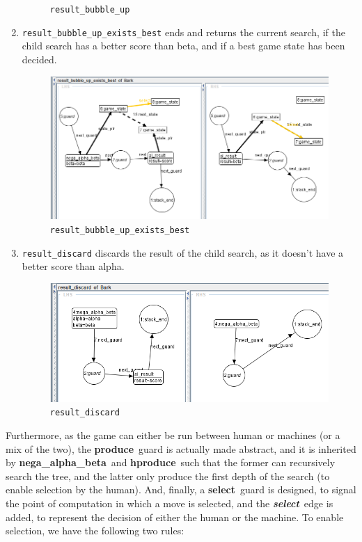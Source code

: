 \documentclass[a4paper, 10pt]{scrartcl}
\newcommand{\noderepr}[1]{\textsf{\textbf{#1}}}
\newcommand{\edgerepr}[1]{\textit{\textbf{#1}}}
\newcommand{\produce}{\noderepr{produce}}
\newcommand{\hproduce}{\noderepr{hproduce}}
\newcommand{\ai}{\noderepr{nega\_alpha\_beta}}
\newcommand{\select}{\noderepr{select}}
\newcommand{\edgeselect}{\edgerepr{select}}
\begin{document}
\begin{enumerate}
\begin{figure}[H]
            \caption{\texttt{result\_bubble\_up}}
        \end{figure}
        \item \texttt{result\_bubble\_up\_exists\_best} ends and returns the current search, if the child search has a better score than beta, and if a best game state has been decided.
        \begin{figure}[H]
            \centering
            \includegraphics[width=.8\linewidth]{images/result_bubble_up_exists_best.png}
            \caption{\texttt{result\_bubble\_up\_exists\_best}}
        \end{figure}
        \item \texttt{result\_discard} discards the result of the child search, as it doesn't have a better score than alpha.
        \begin{figure}[H]
            \centering
            \includegraphics[width=.8\linewidth]{images/result_discard.png}
            \caption{\texttt{result\_discard}}
        \end{figure}
    \end{enumerate}
    Furthermore, as the game can either be run between human or machines (or a mix of the two), the \produce\ guard is actually made abstract, and it is inherited by \ai\ and \hproduce\, such that the former can recursively search the tree, and the latter only produce the first depth of the search (to enable selection by the human). And, finally, a \select\ guard is designed, to signal the point of computation in which a move is selected, and the \edgeselect\ edge is added, to represent the decision of either the human or the machine. To enable selection, we have the following two rules:
\end{document}
